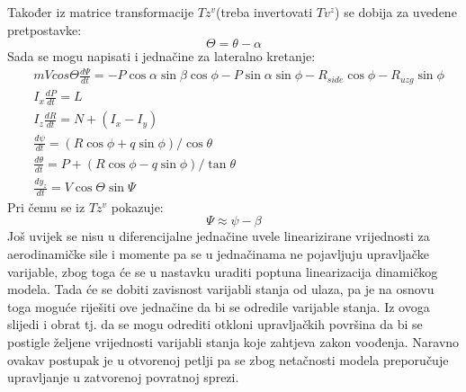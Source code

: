 Također iz matrice transformacije $Tz^v$(treba invertovati $Tv^z$) se dobija za uvedene pretpostavke:
\begin{equation}
    \Theta = \theta - \alpha
\end{equation}
Sada se mogu napisati i jednačine za lateralno kretanje:
\begin{align}
    &mVcos\Theta \frac{d\Psi}{dt}=-P\cos\alpha \sin\beta \cos\phi - P\sin\alpha\sin\phi 
    - R_{side}\cos\phi - R_{uzg}\sin\phi\\
    &I_x\frac{dP}{dt}=L\\
    &I_z\frac{dR}{dt}=N+(I_x-I_y)\\
    &\frac{d\psi}{dt}=(R\cos\phi+q\sin\phi)/\cos\theta\\
    &\frac{d\theta}{dt}=P+(R\cos\phi - q\sin\phi)/\tan\theta\\
    &\frac{dy_z}{dt}=V\cos\Theta\sin\Psi
\end{align}
Pri čemu se iz $Tz^v$ pokazuje:
\begin{equation}
    \Psi \approx \psi-\beta
\end{equation}
Još uvijek se nisu u diferencijalne jednačine uvele linearizirane vrijednosti za aerodinamičke 
sile i momente pa se u jednačinama ne pojavljuju upravljačke varijable, zbog toga će se u nastavku uraditi
poptuna linearizacija dinamičkog modela. Tada će se dobiti zavisnost varijabli stanja od ulaza, pa 
je na osnovu toga moguće riješiti ove jednačine da bi se odredile varijable stanja. Iz ovoga slijedi i obrat 
tj. da se mogu odrediti otkloni upravljačkih površina da bi se postigle željene vrijednosti varijabli stanja 
koje zahtjeva zakon voođenja. Naravno ovakav postupak je u otvorenoj petlji pa se zbog netačnosti modela 
preporučuje upravljanje u zatvorenoj povratnoj sprezi. 
